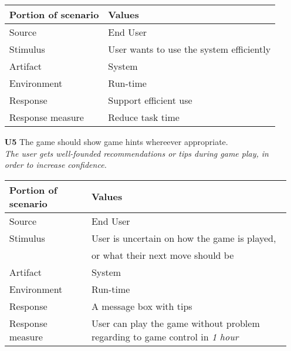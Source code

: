 \begin{itemize}
        \begin{tabular}{| l | l |}
            \hline
            \rowcolor[gray]{0.8}
            \textbf{Portion of scenario} & \textbf{Values} \\
            \hline
            Source & End User \\
            Stimulus & User wants to use the system efficiently \\
            Artifact & System \\
            Environment & Run-time \\
            Response & Support efficient use \\
            Response measure & Reduce task time \\
            \hline
        \end{tabular}
        
        \item[\textbf{U5}] The game should show game hints whereever appropriate. \\
        \textit{\small{The user gets well-founded recommendations or tips during game play, in order to increase confidence.}}
        
        \begin{tabular}{| l | l |}
            \hline
            \rowcolor[gray]{0.8}
            \textbf{Portion of scenario} & \textbf{Values} \\
            \hline
            Source & End User \\
            Stimulus & User is uncertain on how the game is played, \\
             & or what their next move should be \\
            Artifact & System \\
            Environment & Run-time \\
            Response & A message box with tips \\
            Response measure & User can play the game without problem regarding to game control in \emph{1 hour}\\
            \hline
        \end{tabular}
    \end{itemize}